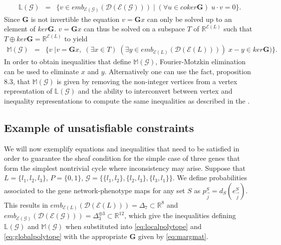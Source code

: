 \begin{eqnarray}\label{eq:localpolytope}
\mathbb{L}(\mathcal{G}) &=& \{ v \in emb_{\mathcal{E}(\mathcal{G})}(\mathcal{D}(\mathcal{E}(\mathcal{G}))) \; | \; (\forall u \in coker \mathbf{G}) \; u \cdot v = 0\}.
\end{eqnarray}
Since $\mathbf{G}$ is not invertible the equation $v = \mathbf{G}x$ can only be solved up to an element of $ker \mathbf{G}$. $v = \mathbf{G}x$ can thus be solved on a subspace $T$ of $\mathbb{R}^{\mathcal{E}(L)}$ such that $T \oplus ker \mathbf{G} = \mathbb{R}^{\mathcal{E}(L)}$ to yield
\begin{eqnarray}\label{eq:globalpolytope}
\mathbb{M}(\mathcal{G}) &=& \{ v \; | v = \mathbf{G} x,\; (\exists x \in T) \; (\exists y \in emb_{\mathcal{E}(L)}(\mathcal{D}(\mathcal{E}(L))))\; x-y \in ker \mathbf{G})  \}.
\end{eqnarray}
In order to obtain inequalities that define $\mathbb{M}(\mathcal{G})$, Fourier-Motzkin elimination can be used to eliminate $x$ and $y$. Alternatively one can use the fact, \cite{Wainwright2007} proposition 8.3, that $\mathbb{M}(\mathcal{G})$ is given by removing the non-integer vertices from a vertex represntation of $\mathbb{L}(\mathcal{G})$ and the ability to interconvert between vertex and inequality representations to compute the same inequalities as described in the .

\subsection{Example of unsatisfiable constraints}\label{sec:inconsistency}
We will now exemplify equations and inequalities that need to be satisfied in order to guarantee the sheaf condition for the simple case of three genes that form the simplest nontrivial cycle where inconsistency may arise. Suppose that $L = \{l_1,l_2,l_3\}$, $P = \{0,1\}$, $\mathcal{G} = \{\{l_1,l_2\},\{l_2,l_3\},\{l_3,l_1\}\}$. We define probabilities associated to the gene network-phenotype maps for any set $S$ as $p^S_{\vec{j}}= d_{S}(e^S_{\vec{j}})$. This results in $emb_{\mathcal{E}(L)}(\mathcal{D}(\mathcal{E}(L))) = \Delta_7 \subset \mathbb{R}^8 $ and $emb_{\mathcal{E}(\mathcal{G})}(\mathcal{D}(\mathcal{E}(\mathcal{G}))) = \Delta^{\oplus 3}_3 \subset \mathbb{R}^{12}$,
which give the inequalities defining $\mathbb{L}(\mathcal{G})$ and $\mathbb{M}(\mathcal{G})$ when substituted into \ref{eq:localpolytope} and \ref{eq:globalpolytope} with the appropriate $\mathbf{G}$ given by \ref{eq:margmat}.


